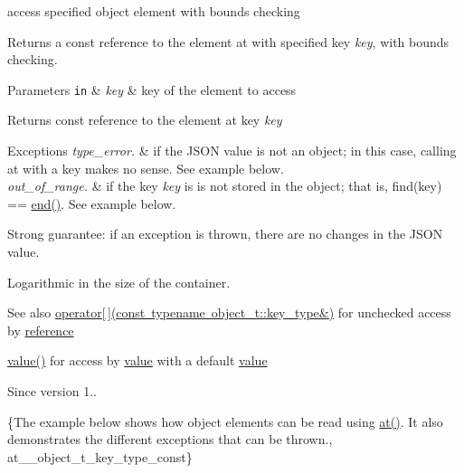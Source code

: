 access specified object element with bounds checking 

Returns a const reference to the element at with specified key {\itshape key}, with bounds checking.


\begin{DoxyParams}[1]{Parameters}
\mbox{\tt in}  & {\em key} & key of the element to access\\
\hline
\end{DoxyParams}
\begin{DoxyReturn}{Returns}
const reference to the element at key {\itshape key} 
\end{DoxyReturn}

\begin{DoxyExceptions}{Exceptions}
{\em type\+\_\+error.} & if the J\+S\+ON value is not an object; in this case, calling {\ttfamily at} with a key makes no sense. See example below. \\
\hline
{\em out\+\_\+of\+\_\+range.} & if the key {\itshape key} is is not stored in the object; that is, {\ttfamily find(key) == \mbox{\hyperlink{classnlohmann_1_1basic__json_a13e032a02a7fd8a93fdddc2fcbc4763c}{end()}}}. See example below.\\
\hline
\end{DoxyExceptions}
Strong guarantee\+: if an exception is thrown, there are no changes in the J\+S\+ON value.

Logarithmic in the size of the container.

\begin{DoxySeeAlso}{See also}
\mbox{\hyperlink{classnlohmann_1_1basic__json_a233b02b0839ef798942dd46157cc0fe6}{operator\mbox{[}$\,$\mbox{]}(const typename object\+\_\+t\+::key\+\_\+type\&)}} for unchecked access by \mbox{\hyperlink{classnlohmann_1_1basic__json_ac6a5eddd156c776ac75ff54cfe54a5bc}{reference}} 

\mbox{\hyperlink{classnlohmann_1_1basic__json_adcf8ca5079f5db993820bf50036bf45d}{value()}} for access by \mbox{\hyperlink{classnlohmann_1_1basic__json_adcf8ca5079f5db993820bf50036bf45d}{value}} with a default \mbox{\hyperlink{classnlohmann_1_1basic__json_adcf8ca5079f5db993820bf50036bf45d}{value}}
\end{DoxySeeAlso}
\begin{DoxySince}{Since}
version 1..
\end{DoxySince}
\{The example below shows how object elements can be read using {\ttfamily \mbox{\hyperlink{classnlohmann_1_1basic__json_a73ae333487310e3302135189ce8ff5d8}{at()}}}. It also demonstrates the different exceptions that can be thrown., at\+\_\+\+\_\+object\+\_\+t\+\_\+key\+\_\+type\+\_\+const\} \mbox{\label{classnlohmann_1_1basic__json_a8ab61397c10f18b305520da7073b2b45}} 
